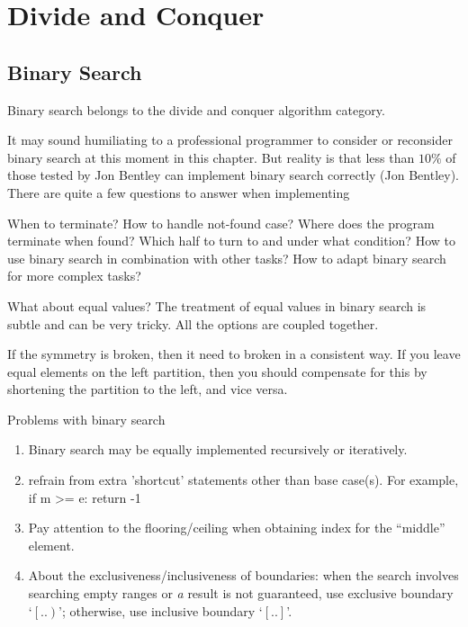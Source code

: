 \documentclass[oneside,11pt]{book}
\theoremstyle{definition}
\theoremstyle{remark}
\begin{document}
\chapter{Divide and Conquer}\label{ch:divideAndConquer}

\section{Binary Search}\label{sec:binary-search}

Binary search belongs to the divide and conquer algorithm category.

\label{Evernote:Print two binary search trees in ascending order}

It may sound humiliating to a professional programmer to consider or reconsider binary search at
this moment in this chapter.
But reality is that less than $10\%$ of those tested by Jon Bentley can implement binary search
correctly (Jon Bentley).
There are quite a few questions to answer when implementing

When to terminate?
How to handle not-found case?
Where does the program terminate when found?
Which half to turn to and under what condition?
How to use binary search in combination with other tasks?
How to adapt binary search for more complex tasks?

What about equal values?
The treatment of equal values in binary search is subtle and can be very tricky.
All the options are coupled together.

If the symmetry is broken, then it need to broken in a consistent way.
If you leave equal elements on the left partition, then you should compensate for this by
shortening the partition to the left, and vice versa.

Problems with binary search
\begin{enumerate}
    \item Binary search may be equally implemented recursively or iteratively.
    \item refrain from extra 'shortcut' statements other than base case(s).
    For example,
    if m >= e:
    return -1
    \item Pay attention to the flooring/ceiling when obtaining index for the ``middle'' element.
    \item About the exclusiveness/inclusiveness of boundaries: when the search involves searching
    empty ranges or \emph{a} result is not guaranteed, use exclusive boundary `$\left[..\right)$';
    otherwise, use inclusive boundary `$\left[..\right]$'.
\end{enumerate}
\end{document}
